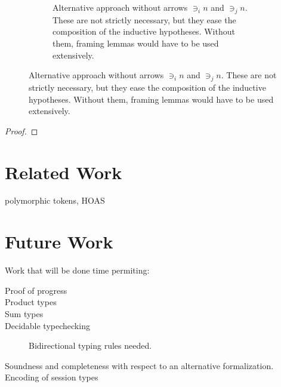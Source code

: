 \documentclass[a4paper,UKenglish,cleveref, autoref, thm-restate,authorcolumns]{lipics-v2019}
\theoremstyle{definition}
\begin{document}
\begin{figure}[h]
\begin{subfigure}{.4\textwidth}
    \caption{
      Alternative approach without arrows $\ni_i n$ and $\ni_j n$.
      These are not strictly necessary, but they ease the composition of the inductive hypotheses.
      Without them, framing lemmas would have to be used extensively.
    }
    \label{fig:subst-compositionality}
  \end{subfigure}
\end{figure}

\begin{proof}
\end{proof}

\section{Related Work}

\cite{previous-work} polymorphic tokens, HOAS

\cite{typing-with-leftovers}

\cite{Higher-inductive-types-for-congruence}

\cite{LTS-semantics}

\cite{work-on-session-types}


\section{Future Work}

Work that will be done time permiting:

\begin{description}

\item [Proof of progress]

\item [Product types]

\item [Sum types]

\item [Decidable typechecking]

  Bidirectional typing rules needed.

\item [Soundness and completeness with respect to an alternative formalization.]

\item [Encoding of session types]

\end{description}



\end{document}
